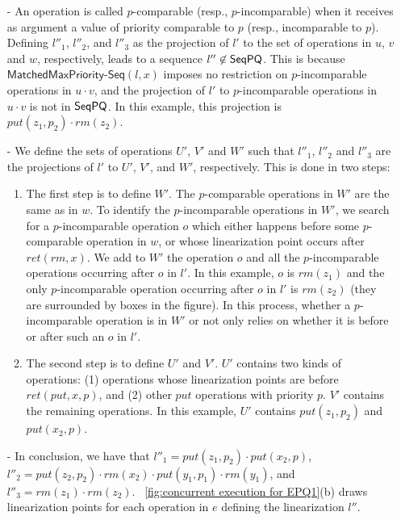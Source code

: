 \documentclass[a4paper,UKenglish]{lipics-v2016}
\begin{document}
\begin{itemize}
\item[-] An operation is called $p$-comparable (resp., $p$-incomparable) when it receives as argument a value of priority comparable to $p$ (resp., incomparable to $p$). Defining $l''_1$, $l''_2$, and $l''_3$ as the projection of $l'$ to the set of operations in $u$, $v$ and $w$, respectively, leads to a sequence $l''\not\in\mathsf{SeqPQ}$. This is because $\mathsf{MatchedMaxPriority\text{-}Seq}(l,x)$ imposes no restriction on  $p$-incomparable operations in $u \cdot v$, and the projection of $l'$ to $p$-incomparable operations in $u \cdot v$ is not in $\mathsf{SeqPQ}$. In this example, this projection is $\textit{put}(z_1,p_2) \cdot \textit{rm}(z_2)$.

\item[-] We define the sets of operations $U'$, $V'$ and $W'$ such that $l''_1$, $l''_2$ and $l''_3$ are the projections of $l'$ to $U'$, $V'$, and $W'$, respectively. This is done in two steps:
\begin{enumerate}
\item The first step is to define $W'$. The $p$-comparable operations in $W'$ are the same as in $w$. To identify the $p$-incomparable operations in $W'$, we search for a $p$-incomparable operation $o$ which either happens before some $p$-comparable operation in $w$, or whose linearization point occurs after $\textit{ret}(\textit{rm},x)$. We add to $W'$ the operation $o$ and all the $p$-incomparable operations occurring after $o$ in $l'$. In this example, $o$ is $\textit{rm}(z_1)$ and the only $p$-incomparable operation occurring after $o$ in $l'$ is $\textit{rm}(z_2)$ (they are surrounded by boxes in the figure). In this process, whether a $p$-incomparable operation is in $W'$ or not only relies on whether it is before or after such an $o$ in $l'$.
\item The second step is to define $U'$ and $V'$. $U'$ contains two kinds of operations: (1) operations whose linearization points are before $\textit{ret}(\textit{put},x,p)$, and (2) other $\textit{put}$ operations with priority $p$. $V'$ contains the remaining operations. In this example, $U'$ contains $\textit{put}(z_1,p_2)$ and $\textit{put}(x_2,p)$.
\end{enumerate}
\item[-] In conclusion, we have that $l''_1 = \textit{put}(z_1,p_2) \cdot \textit{put}(x_2,p)$, $l''_2 = \textit{put}(z_2,p_2) \cdot \textit{rm}(x_2) \cdot \textit{put}(y_1,p_1) \cdot \textit{rm}(y_1)$, and $l''_3 = \textit{rm}(z_1) \cdot \textit{rm}(z_2)$. \figurename~\ref{fig:concurrent execution for EPQ1}(b) draws linearization points for each operation in $e$ defining the linearization $l''$.
\end{itemize}
\end{document}
